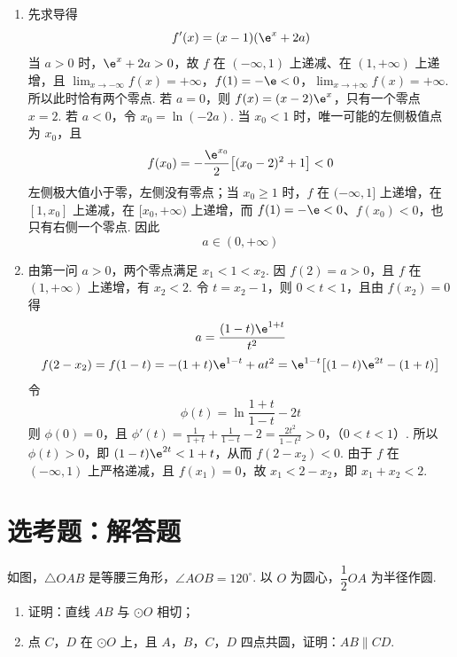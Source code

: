 \begin{solution}
\begin{enumerate}
\item 先求导得
\[
f'(x)=(x-1)(\e^x+2a)
\]
当 \(a>0\) 时，\(\e^x+2a>0\)，故 \(f\) 在 \((-\infty,1)\) 上递减、在 \((1,+\infty)\) 上递增，且
\(\lim_{x\to-\infty}f(x)=+\infty\)，\(f(1)=-\e<0\)，\(\lim_{x\to+\infty}f(x)=+\infty\).
所以此时恰有两个零点. 若 \(a=0\)，则 \(f(x)=(x-2)\e^x\)，只有一个零点 \(x=2\).
若 \(a<0\)，令 \(x_0=\ln(-2a)\). 当 \(x_0<1\) 时，唯一可能的左侧极值点为 \(x_0\)，且
\[
f(x_0)=-\frac{\e^{x_0}}2\bigl[(x_0-2)^2+1\bigr]<0
\]
左侧极大值小于零，左侧没有零点；当 \(x_0\geqslant1\) 时，\(f\) 在 \((-\infty,1]\) 上递增，在 \([1,x_0]\) 上递减，在 \([x_0,+\infty)\) 上递增，而 \(f(1)=-\e<0\)、\(f(x_0)<0\)，也只有右侧一个零点. 因此
\[
a\in(0,+\infty)
\]
\item 由第一问 \(a>0\)，两个零点满足 \(x_1<1<x_2\). 因 \(f(2)=a>0\)，且 \(f\) 在 \((1,+\infty)\) 上递增，有 \(x_2<2\). 令 \(t=x_2-1\)，则 \(0<t<1\)，且由 \(f(x_2)=0\) 得
\[
a=\frac{(1-t)\e^{1+t}}{t^2}
\]
\[
f(2-x_2)=f(1-t)=-(1+t)\e^{1-t}+at^2
=\e^{1-t}\bigl[(1-t)\e^{2t}-(1+t)\bigr]
\]
令
\[
\phi(t)=\ln\frac{1+t}{1-t}-2t
\]
则 \(\phi(0)=0\)，且
\(\phi'(t)=\frac1{1+t}+\frac1{1-t}-2 =\frac{2t^2}{1-t^2}>0\)，（\(0<t<1\)）.
所以 \(\phi(t)>0\)，即 \((1-t)\e^{2t}<1+t\)，从而 \(f(2-x_2)<0\). 由于 \(f\) 在 \((-\infty,1)\) 上严格递减，且 \(f(x_1)=0\)，故 \(x_1<2-x_2\)，即 \(x_1+x_2<2\).
\end{enumerate}
\end{solution}


\section{选考题：解答题}

\begin{problem}
如图，\(\triangle OAB\) 是等腰三角形，\(\angle AOB=120^\circ\). 以 \(O\) 为圆心，\(\dfrac12 OA\) 为半径作圆.

\begin{enumerate}
\item 证明：直线 \(AB\) 与 \(\odot O\) 相切；
\item 点 \(C\)，\(D\) 在 \(\odot O\) 上，且 \(A\)，\(B\)，\(C\)，\(D\) 四点共圆，证明：\(AB\parallel CD\).
\end{enumerate}

\end{problem}

